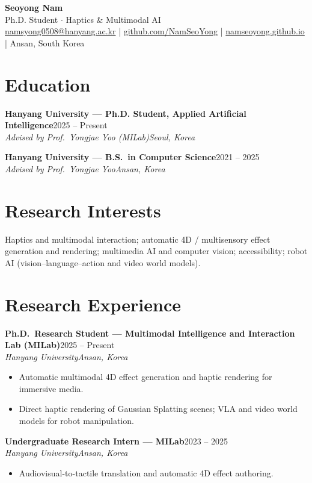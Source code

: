 \documentclass[11pt,a4paper]{article}
\newcommand{\cvevent}[4]{%
  {\textbf{#1}\hfill{\color{muted}#2}}\\[1pt]
  {\textit{#3}\hfill{\color{muted}\textit{#4}}}\par\vspace{2pt}}
\begin{document}
{\Huge\bfseries Seoyong Nam}\\[4pt]
{\color{muted}\large Ph.D. Student $\cdot$ Haptics \& Multimodal AI}\\[6pt]
\href{mailto:namsyong0508@hanyang.ac.kr}{namsyong0508@hanyang.ac.kr} \quad|\quad
\href{https://github.com/NamSeoYong}{github.com/NamSeoYong} \quad|\quad
\href{https://namseoyong.github.io}{namseoyong.github.io} \quad|\quad
Ansan, South Korea
\vspace{4pt}

\section{Education}
\cvevent{Hanyang University --- Ph.D. Student, Applied Artificial Intelligence}{2025 -- Present}{Advised by Prof.\ Yongjae Yoo (MILab)}{Seoul, Korea}
\vspace{-2pt}\par\vspace{4pt}
\cvevent{Hanyang University --- B.S.\ in Computer Science}{2021 -- 2025}{Advised by Prof.\ Yongjae Yoo}{Ansan, Korea}
\vspace{-2pt}

\section{Research Interests}
Haptics and multimodal interaction; automatic 4D / multisensory effect generation and rendering;
multimedia AI and computer vision; accessibility; robot AI (vision--language--action and video world models).

\section{Research Experience}
\cvevent{Ph.D.\ Research Student --- Multimodal Intelligence and Interaction Lab (MILab)}{2025 -- Present}{Hanyang University}{Ansan, Korea}
\begin{itemize}
  \item Automatic multimodal 4D effect generation and haptic rendering for immersive media.
  \item Direct haptic rendering of Gaussian Splatting scenes; VLA and video world models for robot manipulation.
\end{itemize}
\vspace{2pt}
\cvevent{Undergraduate Research Intern --- MILab}{2023 -- 2025}{Hanyang University}{Ansan, Korea}
\begin{itemize}
  \item Audiovisual-to-tactile translation and automatic 4D effect authoring.
\end{itemize}
\end{document}
